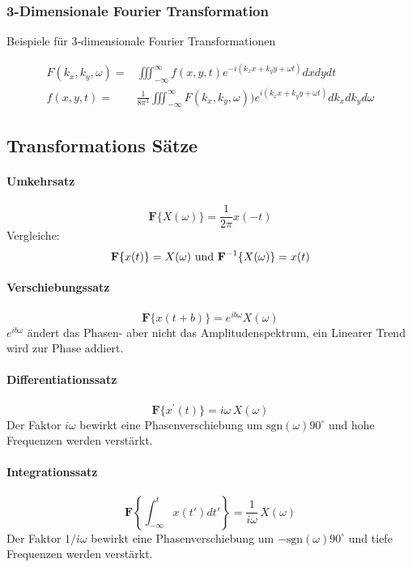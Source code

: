 \subsubsection{3-Dimensionale Fourier Transformation}
Beispiele für 3-dimensionale Fourier Transformationen

\begin{align}
F(k_x,k_y,\omega)= & \iiint_{-\infty}^\infty f(x,y,t)e^{-i(k_xx+k_yy+\omega t)} dx dy dt\\
f(x,y,t)= & \frac{1}{8\pi^3} \iiint_{-\infty}^\infty F(k_x,k_y,\omega))e^{i(k_xx+k_yy+\omega t)} dk_x dk_y d\omega
\end{align}

\subsection{Transformations Sätze}

\paragraph{Umkehrsatz}
\begin{equation}
\textbf{F} \{X(\omega)\}=\frac{1}{2\pi} x(-t)
\end{equation}
Vergleiche:
\[
{\bf F} \{x(t)\}=X(\omega) \mbox{ und } {\bf F}^{-1}\{X(\omega)\}=x(t)
\]


\paragraph{Verschiebungssatz}
\begin{equation}
\textbf{F}\{x(t+b)\}=e^{ib\omega}X(\omega)
\end{equation}
$e^{ib\omega}$ ändert das Phasen- aber nicht das Amplitudenspektrum, ein Linearer Trend wird zur Phase addiert.


\paragraph{Differentiationssatz}
\begin{equation}
\textbf{F}\{x^\prime(t)\}=i\omega\,X(\omega)
\end{equation}
Der Faktor $i \omega$ bewirkt eine Phasenverschiebung um $\mbox{sgn}(\omega) 90^\circ$ und hohe Frequenzen werden verstärkt.

\paragraph{Integrationssatz}
\begin{equation}
\textbf{F} \left\lbrace \int_{-\infty}^{t} x(t')dt' \right\rbrace = \frac{1}{i\omega}\,X(\omega)
\end{equation}
Der Faktor $1/i\omega$ bewirkt eine Phasenverschiebung um $-\mbox{sgn}(\omega) 90^\circ$ und tiefe Frequenzen werden verstärkt.

